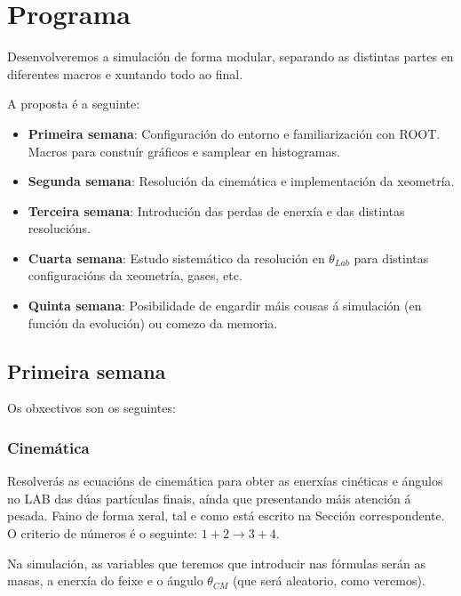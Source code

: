 \documentclass[11pt, a4paper]{article}
\begin{document}
\section{Programa}
Desenvolveremos a simulación de forma modular, separando as distintas partes en diferentes macros e xuntando todo ao final.

A proposta é a seguinte:
\begin{itemize}
    \item \textbf{Primeira semana}: Configuración do entorno e familiarización con ROOT. Macros para constuír gráficos e samplear en histogramas.
    \item \textbf{Segunda semana}: Resolución da cinemática e implementación da xeometría.
    \item \textbf{Terceira semana}: Introdución das perdas de enerxía e das distintas resolucións.
    \item \textbf{Cuarta semana}: Estudo sistemático da resolución en $\theta_{Lab}$ para distintas configuracións da xeometría, gases, etc.
    \item \textbf{Quinta semana}: Posibilidade de engardir máis cousas á simulación (en función da evolución) ou comezo da memoria.
\end{itemize}

\subsection{Primeira semana}
Os obxectivos son os seguintes:

\subsubsection*{Cinemática}
Resolverás as ecuacións de cinemática para obter as enerxías cinéticas e ángulos no LAB das dúas partículas finais, aínda que presentando máis atención á pesada. Faino de forma xeral, tal e como está escrito na Sección correspondente. O criterio de números é o seguinte: $1 + 2 \longrightarrow 3 + 4$.

Na simulación, as variables que teremos que introducir nas fórmulas serán as masas, a enerxía do feixe e o ángulo $\theta_{CM}$ (que será aleatorio, como veremos).
\end{document}
